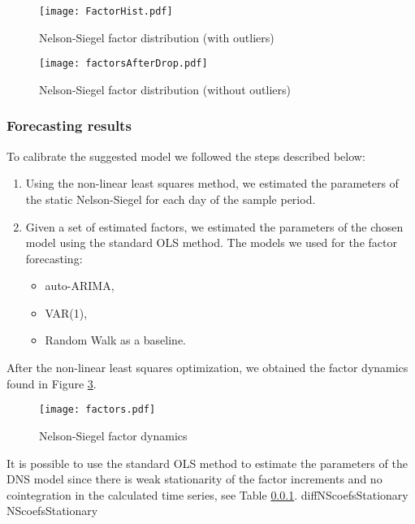             \begin{figure}
                \texttt{[image: FactorHist.pdf]}
                \caption{Nelson-Siegel factor distribution (with outliers)}
                \label{fig:NSHistOutliers}
            \end{figure}

            \begin{figure}
                \texttt{[image: factorsAfterDrop.pdf]}
                \caption{Nelson-Siegel factor distribution (without outliers)}
                \label{fig:NSHistDropped}
            \end{figure}

        \subsubsection{Forecasting results}
            To calibrate the suggested model we followed the steps described below:
            \begin{enumerate}
                \item Using the non-linear least squares method, we estimated the parameters of the static Nelson-Siegel 
                for each day of the sample period.
                \item Given a set of estimated factors, we estimated the parameters of the chosen model using the standard 
                OLS method. The models we used for the factor forecasting:
                    \begin{itemize}
                        \item auto-ARIMA,
                        \item VAR(1),
                        \item Random Walk as a baseline.
                    \end{itemize}
            \end{enumerate}

            After the non-linear least squares optimization, we obtained the factor dynamics found in Figure \ref{fig:factordynamics}.
            \begin{figure}
                \texttt{[image: factors.pdf]}
                \caption{Nelson-Siegel factor dynamics}
                \label{fig:factordynamics}
            \end{figure}

            It is possible to use the standard OLS method to estimate the parameters of the DNS model since there is 
            weak stationarity of the factor increments and no cointegration in the calculated time series, see Table \ref{}. 
            {diffNScoefsStationary}
            {NScoefsStationary}

